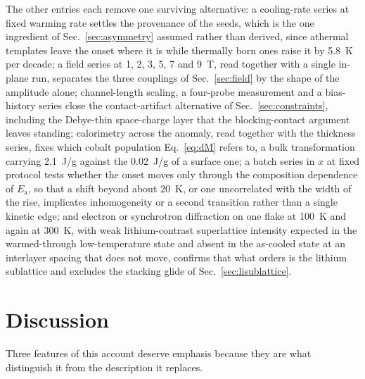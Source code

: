 \documentclass[reprint,twocolumn,prb,amsmath,amssymb,superscriptaddress,floatfix]{revtex4-2}
\newcommand{\Ea}{E_{\mathrm{a}}}
\begin{document}
The other entries each remove one surviving alternative: a cooling-rate series at fixed warming
rate settles the provenance of the seeds, which is the one ingredient of
Sec.~\ref{sec:asymmetry} assumed rather than derived, since athermal templates leave the onset
where it is while thermally born ones raise it by 5.8~K per decade; a field series at 1, 2, 3,
5, 7 and 9~T, read together with a single in-plane run, separates the three couplings of
Sec.~\ref{sec:field} by the shape of the amplitude alone; channel-length scaling, a four-probe
measurement and a bias-history series close the contact-artifact alternative of
Sec.~\ref{sec:constraints}, including the Debye-thin space-charge layer that the
blocking-contact argument leaves standing; calorimetry across the anomaly, read together with
the thickness series, fixes which cobalt population Eq.~\eqref{eq:dM} refers to, a bulk
transformation carrying 2.1~J/g against the 0.02~J/g of a surface one; a batch series in $x$ at
fixed protocol tests whether the onset moves only through the composition dependence of $\Ea$,
so that a shift beyond about 20~K, or one uncorrelated with the width of the rise, implicates
inhomogeneity or a second transition rather than a single kinetic edge; and electron or
synchrotron diffraction on one flake at 100~K and again at 300~K, with weak lithium-contrast
superlattice intensity expected in the warmed-through low-temperature state and absent in the
as-cooled state at an interlayer spacing that does not move, confirms that what orders is the
lithium sublattice and excludes the stacking glide of Sec.~\ref{sec:lisublattice}.

\section{Discussion}
\label{sec:discussion}

Three features of this account deserve emphasis because they are what distinguish it from the
description it replaces.
\end{document}
